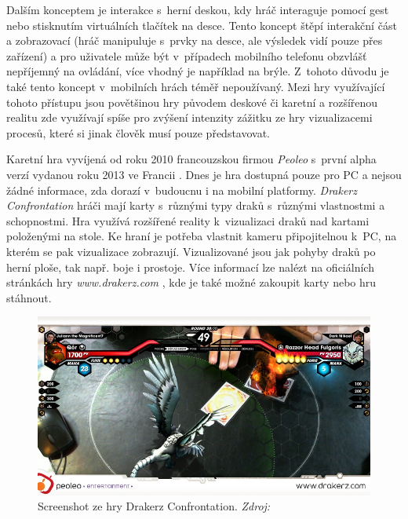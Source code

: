 \documentclass[twoside,12pt]{article}
\begin{document}
Dalším konceptem je interakce s~herní deskou, kdy hráč interaguje pomocí gest nebo stisknutím virtuálních tlačítek na desce. Tento koncept štěpí interakční část a zobrazovací (hráč manipuluje s~prvky na desce, ale výsledek vidí pouze přes zařízení) a pro uživatele může být v~případech mobilního telefonu obzvlášť nepříjemný na ovládání, více vhodný je například na brýle. Z~tohoto důvodu je také tento koncept v~mobilních hrách téměř nepoužívaný. Mezi hry využívající tohoto přístupu jsou povětšinou hry původem deskové či karetní a rozšířenou realitu zde využívají spíše pro zvýšení intenzity zážitku ze hry vizualizacemi procesů, které si jinak člověk musí pouze představovat. 

%
%

Karetní hra vyvíjená od roku 2010 francouzskou firmou \textit{Peoleo} s~první alpha verzí vydanou roku 2013 ve Francii \cite{venturebeat}. Dnes je hra dostupná pouze pro PC a nejsou žádné informace, zda dorazí v~budoucnu i na mobilní platformy. \textit{Drakerz Confrontation} hráči mají karty s~různými typy draků s~různými vlastnostmi a schopnostmi. Hra využívá rozšířené reality k~vizualizaci draků nad kartami položenými na stole. Ke hraní je potřeba vlastnit kameru připojitelnou k~PC, na kterém se pak vizualizace zobrazují. Vizualizované jsou jak pohyby draků po herní ploše, tak např. boje i prostoje. Více informací lze nalézt na oficiálních stránkách hry \textit{www.drakerz.com} \cite{peoleo_about}, kde je také možné zakoupit karty nebo hru stáhnout.


\begin{figure}[H]
    \includegraphics[width=424px, center]{images/drakerz-confrontation.jpg}
    \caption[]{Screenshot ze hry Drakerz Confrontation. \textit{Zdroj: \cite{drakerz_screenshot} }}
    \label{drakerz_screenshot}
\end{figure}
\end{document}
